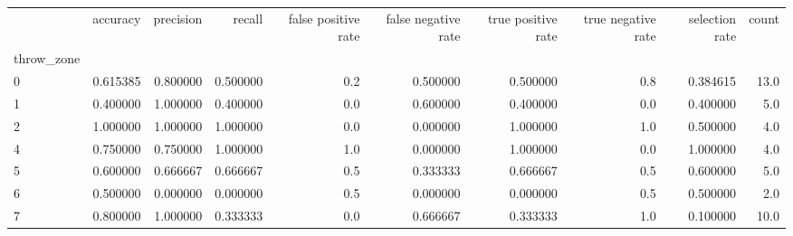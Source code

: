 \begin{tabular}{lrrrrrrrrr}
\toprule
{} &  accuracy &  precision &    recall &  false positive rate &  false negative rate &  true positive rate &  true negative rate &  selection rate &  count \\
throw\_zone &           &            &           &                      &                      &                     &                     &                 &        \\
\midrule
0          &  0.615385 &   0.800000 &  0.500000 &                  0.2 &             0.500000 &            0.500000 &                 0.8 &        0.384615 &   13.0 \\
1          &  0.400000 &   1.000000 &  0.400000 &                  0.0 &             0.600000 &            0.400000 &                 0.0 &        0.400000 &    5.0 \\
2          &  1.000000 &   1.000000 &  1.000000 &                  0.0 &             0.000000 &            1.000000 &                 1.0 &        0.500000 &    4.0 \\
4          &  0.750000 &   0.750000 &  1.000000 &                  1.0 &             0.000000 &            1.000000 &                 0.0 &        1.000000 &    4.0 \\
5          &  0.600000 &   0.666667 &  0.666667 &                  0.5 &             0.333333 &            0.666667 &                 0.5 &        0.600000 &    5.0 \\
6          &  0.500000 &   0.000000 &  0.000000 &                  0.5 &             0.000000 &            0.000000 &                 0.5 &        0.500000 &    2.0 \\
7          &  0.800000 &   1.000000 &  0.333333 &                  0.0 &             0.666667 &            0.333333 &                 1.0 &        0.100000 &   10.0 \\
\bottomrule
\end{tabular}
